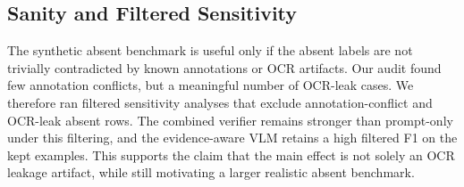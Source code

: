 \subsection{Sanity and Filtered Sensitivity}

The synthetic absent benchmark is useful only if the absent labels are not trivially contradicted by known annotations or OCR artifacts. Our audit found few annotation conflicts, but a meaningful number of OCR-leak cases. We therefore ran filtered sensitivity analyses that exclude annotation-conflict and OCR-leak absent rows. The combined verifier remains stronger than prompt-only under this filtering, and the evidence-aware VLM retains a high filtered F1 on the kept examples. This supports the claim that the main effect is not solely an OCR leakage artifact, while still motivating a larger realistic absent benchmark.
